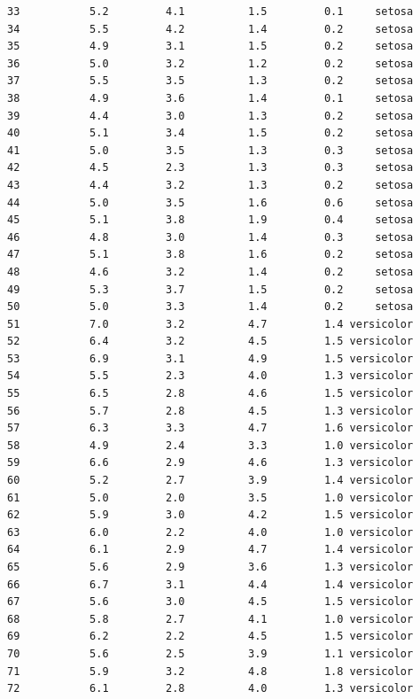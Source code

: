 \documentclass[
  brazilian,
]{book}
\begin{document}
\begin{verbatim}
33           5.2         4.1          1.5         0.1     setosa
34           5.5         4.2          1.4         0.2     setosa
35           4.9         3.1          1.5         0.2     setosa
36           5.0         3.2          1.2         0.2     setosa
37           5.5         3.5          1.3         0.2     setosa
38           4.9         3.6          1.4         0.1     setosa
39           4.4         3.0          1.3         0.2     setosa
40           5.1         3.4          1.5         0.2     setosa
41           5.0         3.5          1.3         0.3     setosa
42           4.5         2.3          1.3         0.3     setosa
43           4.4         3.2          1.3         0.2     setosa
44           5.0         3.5          1.6         0.6     setosa
45           5.1         3.8          1.9         0.4     setosa
46           4.8         3.0          1.4         0.3     setosa
47           5.1         3.8          1.6         0.2     setosa
48           4.6         3.2          1.4         0.2     setosa
49           5.3         3.7          1.5         0.2     setosa
50           5.0         3.3          1.4         0.2     setosa
51           7.0         3.2          4.7         1.4 versicolor
52           6.4         3.2          4.5         1.5 versicolor
53           6.9         3.1          4.9         1.5 versicolor
54           5.5         2.3          4.0         1.3 versicolor
55           6.5         2.8          4.6         1.5 versicolor
56           5.7         2.8          4.5         1.3 versicolor
57           6.3         3.3          4.7         1.6 versicolor
58           4.9         2.4          3.3         1.0 versicolor
59           6.6         2.9          4.6         1.3 versicolor
60           5.2         2.7          3.9         1.4 versicolor
61           5.0         2.0          3.5         1.0 versicolor
62           5.9         3.0          4.2         1.5 versicolor
63           6.0         2.2          4.0         1.0 versicolor
64           6.1         2.9          4.7         1.4 versicolor
65           5.6         2.9          3.6         1.3 versicolor
66           6.7         3.1          4.4         1.4 versicolor
67           5.6         3.0          4.5         1.5 versicolor
68           5.8         2.7          4.1         1.0 versicolor
69           6.2         2.2          4.5         1.5 versicolor
70           5.6         2.5          3.9         1.1 versicolor
71           5.9         3.2          4.8         1.8 versicolor
72           6.1         2.8          4.0         1.3 versicolor

\end{verbatim}
\end{document}
